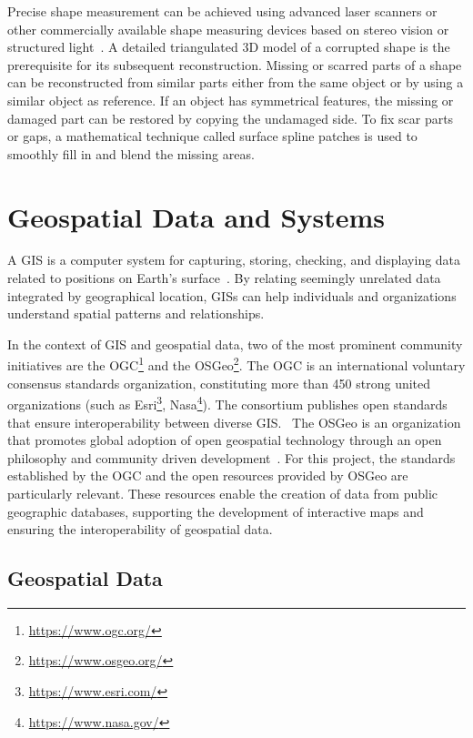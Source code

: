 Precise shape measurement can be achieved using advanced laser scanners or other commercially available shape measuring devices based on stereo 
vision or structured light~\cite{7801178}. A detailed triangulated \gls{3D} model of a corrupted shape is the prerequisite for its subsequent reconstruction. 
Missing or scarred parts of a shape can be reconstructed from similar parts either from the same
object or by using a similar object as reference. If an object has symmetrical features, the missing or damaged part can be restored by copying the undamaged side.
To fix scar parts or gaps, a mathematical technique called surface spline patches is used to smoothly fill in and blend the missing areas.

\section{Geospatial Data and Systems}
\label{sec:geographic_information_system}

A \acrfull{GIS} is a computer system for capturing, storing, checking, and displaying data related to positions on Earth’s 
surface~\cite{natgeo_2024}. By relating seemingly unrelated data integrated by geographical location, \glspl{GIS} can help individuals and organizations understand spatial patterns and relationships.

In the context of \gls{GIS} and geospatial data, two of the most prominent community initiatives are the \gls{OGC}\footnote{\url{https://www.ogc.org/}} and the \gls{OSGeo}\footnote{\url{https://www.osgeo.org/}}.  
The \gls{OGC} is an international voluntary consensus standards organization, constituting more than 450 strong united organizations (such as Esri\footnote{\url{https://www.esri.com/}}, Nasa\footnote{\url{https://www.nasa.gov/}}). The consortium publishes open standards that ensure interoperability between diverse \gls{GIS}.~\cite{ogc_who_we_are, ogcapi}
The \gls{OSGeo} is an organization that promotes global adoption of open geospatial technology through an open philosophy and community driven development~\cite{osgeo_about}. 
For this project, the standards established by the \gls{OGC} and the open resources provided by \gls{OSGeo} are particularly relevant. 
These resources enable the creation of data from public geographic databases, supporting the development of interactive maps and ensuring the interoperability of geospatial data.

\subsection{Geospatial Data} 
\label{sub:geospatial_data}

